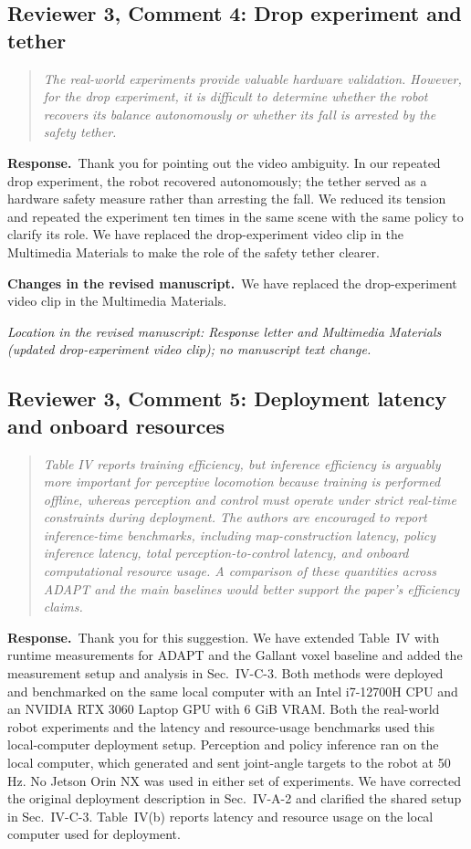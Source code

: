 \documentclass[11pt]{article}
\newenvironment{reviewcomment}{\begin{quote}\color{reviewblue}\itshape}{\end{quote}}
\newcommand{\Response}{\par\noindent\textbf{Response.}\ }
\newcommand{\Changes}{\par\noindent\textbf{Changes in the revised manuscript.}\ }
\newcommand{\Location}[1]{\par\noindent\textit{Location in the revised manuscript: #1}}
\begin{document}
\subsection*{Reviewer 3, Comment 4: Drop experiment and tether}
\begin{reviewcomment}
The real-world experiments provide valuable hardware validation. However, for the drop experiment, it is difficult to determine whether the robot recovers its balance autonomously or whether its fall is arrested by the safety tether.
\end{reviewcomment}
\Response Thank you for pointing out the video ambiguity. In our repeated drop experiment, the robot recovered autonomously; the tether served as a hardware safety measure rather than arresting the fall. We reduced its tension and repeated the experiment ten times in the same scene with the same policy to clarify its role. We have replaced the drop-experiment video clip in the Multimedia Materials to make the role of the safety tether clearer.
\Changes We have replaced the drop-experiment video clip in the Multimedia Materials.
\Location{Response letter and Multimedia Materials (updated drop-experiment video clip); no manuscript text change.}



\subsection*{Reviewer 3, Comment 5: Deployment latency and onboard resources}
\begin{reviewcomment}
Table IV reports training efficiency, but inference efficiency is arguably more important for perceptive locomotion because training is performed offline, whereas perception and control must operate under strict real-time constraints during deployment. The authors are encouraged to report inference-time benchmarks, including map-construction latency, policy inference latency, total perception-to-control latency, and onboard computational resource usage. A comparison of these quantities across ADAPT and the main baselines would better support the paper's efficiency claims.
\end{reviewcomment}
\Response Thank you for this suggestion. We have extended Table~IV with runtime measurements for ADAPT and the Gallant voxel baseline and added the measurement setup and analysis in Sec.~IV-C-3. Both methods were deployed and benchmarked on the same local computer with an Intel i7-12700H CPU and an NVIDIA RTX 3060 Laptop GPU with 6 GiB VRAM. Both the real-world robot experiments and the latency and resource-usage benchmarks used this local-computer deployment setup. Perception and policy inference ran on the local computer, which generated and sent joint-angle targets to the robot at 50 Hz. No Jetson Orin NX was used in either set of experiments. We have corrected the original deployment description in Sec.~IV-A-2 and clarified the shared setup in Sec.~IV-C-3. Table~IV(b) reports latency and resource usage on the local computer used for deployment.
\end{document}
